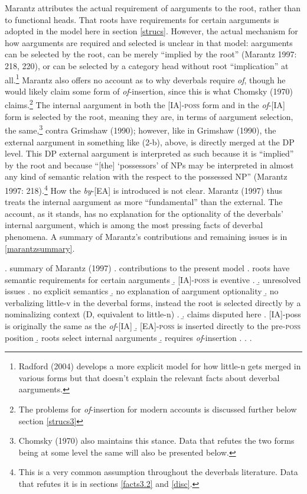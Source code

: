 \documentclass[12pt]{article}
\begin{document}
\par \hfill \par

\doublespacing

Marantz attributes the actual requirement of aarguments to the root, rather than to functional heads. That roots have requirements for certain aarguments is adopted in the model here in section \ref{strucs}. However, the actual mechanism for how aarguments are required and selected is unclear in that model: aarguments can be selected by the root, can be merely ``implied by the root'' (Marantz 1997: 218, 220), or can be selected by a category head without root ``implication'' at all.\footnote{ Radford (2004) develops a more explicit model for how little-n gets merged in various forms but that doesn't explain the relevant facts about deverbal aarguments.} Marantz also offers no account as to why deverbals require \textit{of}, though he would likely claim some form of \textit{of}-insertion, since this is what Chomsky (1970) claims.\footnote{ The problems for \textit{of}-insertion for modern accounts is discussed further below section \ref{strucs3}} The internal aargument in both the [IA]-\textsc{poss} form and in the \textit{of}-[IA] form is selected by the root, meaning they are, in terms of aargument selection, the same,\footnote{ Chomsky (1970) also maintains this stance. Data that refutes the two forms being at some level the same will also be presented below.} contra Grimshaw (1990); however, like in Grimshaw (1990), the external aargument in something like (2-b), above, is directly merged at the DP level. This DP external aargument is interpreted as such because it is ``implied'' by the root and because ``[the] `possessors' of NPs may be interpreted in almost any kind of semantic relation with the respect to the possessed NP'' (Marantz 1997: 218).\footnote{ This is a very common assumption throughout the deverbals literature. Data that refutes it is in sections \ref{facts3.2} and \ref{disc}.} How the \textit{by}-[EA] is introduced is not clear. Marantz (1997) thus treats the internal aargument as more ``fundamental'' than the external. The account, as it stands, has no explanation for the optionality of the deverbals' internal aargument, which is among the most pressing facts of deverbal phenomena. A summary of Marantz's contributions and remaining issues is in \ref{marantzsummary}.

\singlespacing

\ex. \label{marantzsummary} summary of Marantz (1997)
\a. contributions to the present model
\a. roots have semantic requirements for certain aarguments
\b. [IA]-\textsc{poss} is eventive
\z.
\b. unresolved issues
\a. no explicit semantics
\b. no explanation of aargument optionality
\b. no verbalizing little-v in the deverbal forms, instead the root is selected directly by a nominalizing context (D, equivalent to little-n)
\z.
\b. claims disputed here
\a. [IA]-poss is originally the same as the \textit{of}-[IA]
\b. [EA]-\textsc{poss} is inserted directly to the pre-\textsc{poss} position
\b. roots select internal aarguments
\b. requires \textit{of}-insertion
\z. \z. \z. \par \par
\end{document}
